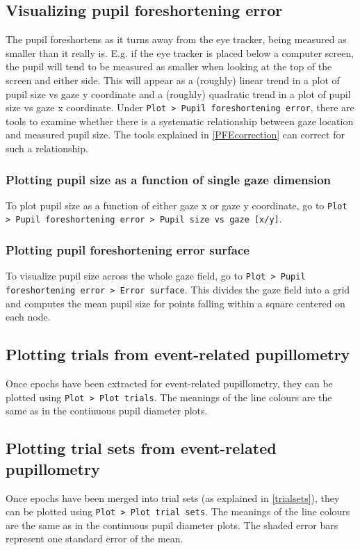 \documentclass{article}
\begin{document}
\subsection{Visualizing pupil foreshortening error} \label{PFEplot}
The pupil foreshortens as it turns away from the eye tracker, being measured as smaller than it really is. E.g. if the eye tracker is placed below a computer screen, the pupil will tend to be measured as smaller when looking at the top of the screen and either side. This will appear as a (roughly) linear trend in a plot of pupil size vs gaze y coordinate and a (roughly) quadratic trend in a plot of pupil size vs gaze x coordinate. Under \texttt{Plot > Pupil foreshortening error}, there are tools to examine whether there is a systematic relationship between gaze location and measured pupil size. The tools explained in \ref{PFEcorrection} can correct for such a relationship.
\subsubsection{Plotting pupil size as a function of single gaze dimension}
To plot pupil size as a function of either gaze x or gaze y coordinate, go to \texttt{Plot > Pupil foreshortening error > Pupil size vs gaze [x/y]}.
\subsubsection{Plotting pupil foreshortening error surface}
To visualize pupil size across the whole gaze field, go to \texttt{Plot > Pupil foreshortening error > Error surface}. This divides the gaze field into a grid and computes the mean pupil size for points falling within a square centered on each node.

\subsection{Plotting trials from event-related pupillometry}
Once epochs have been extracted for event-related pupillometry, they can be plotted using \texttt{Plot > Plot trials}. The meanings of the line colours are the same as in the continuous pupil diameter plots.

\subsection{Plotting trial sets from event-related pupillometry}
Once epochs have been merged into trial sets (as explained in \ref{trialsets}), they can be plotted using \texttt{Plot > Plot trial sets}. The meanings of the line colours are the same as in the continuous pupil diameter plots. The shaded error bars represent one standard error of the mean.
\end{document}
